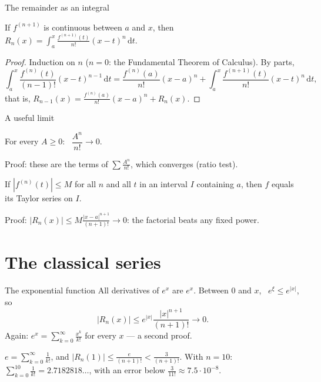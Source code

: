 \documentclass[10pt]{wosm-slides}
\newcommand{\dt}{\,\mathrm{d}t}
\begin{document}
\begin{frame}{The remainder as an integral}
  \begin{theorem}
    If $f^{(n+1)}$ is continuous between $a$ and $x$, then
    $R_n(x) = \int_a^x \frac{f^{(n+1)}(t)}{n!} (x - t)^n \dt$.
  \end{theorem}
  \begin{proof}
    Induction on $n$ ($n = 0$: the Fundamental Theorem of Calculus). By parts,
    \[ \int_a^x \frac{f^{(n)}(t)}{(n-1)!} (x - t)^{n-1} \dt
       = \frac{f^{(n)}(a)}{n!} (x - a)^n + \int_a^x \frac{f^{(n+1)}(t)}{n!} (x - t)^n \dt , \]
    that is, $R_{n-1}(x) = \frac{f^{(n)}(a)}{n!}(x-a)^n + R_n(x)$.
  \end{proof}
\end{frame}

\begin{frame}{A useful limit}
  \begin{lemma}
    For every $A \ge 0$: \ $\dfrac{A^n}{n!} \to 0$.
  \end{lemma}
  {\small Proof: these are the terms of $\sum \frac{A^n}{n!}$, which converges (ratio test).\par}
  \pause
  \begin{corollary}
    If $|f^{(n)}(t)| \le M$ for all $n$ and all $t$ in an interval $I$ containing $a$, then
    $f$ equals its Taylor series on $I$.
  \end{corollary}
  {\small Proof: $|R_n(x)| \le M \frac{|x - a|^{n+1}}{(n+1)!} \to 0$: the factorial beats any
  fixed power.\par}
\end{frame}

\section{The classical series}

\begin{frame}{The exponential function}
  All derivatives of $e^x$ are $e^x$. Between $0$ and $x$, \ $e^\xi \le e^{|x|}$, so
  \[ |R_n(x)| \le e^{|x|} \frac{|x|^{n+1}}{(n+1)!} \to 0 . \]
  Again: $e^x = \sum_{k=0}^\infty \frac{x^k}{k!}$ for every $x$ --- a second proof.
  \pause
  \begin{example}[Computing $e$]
    $e = \sum_{k=0}^\infty \frac{1}{k!}$, and $|R_n(1)| \le \frac{e}{(n+1)!} < \frac{3}{(n+1)!}$.
    With $n = 10$: \ $\sum_{k=0}^{10} \frac{1}{k!} = 2.7182818\ldots$, with an error below
    $\frac{3}{11!} \approx 7.5 \cdot 10^{-8}$.
  \end{example}
\end{frame}
\end{document}
